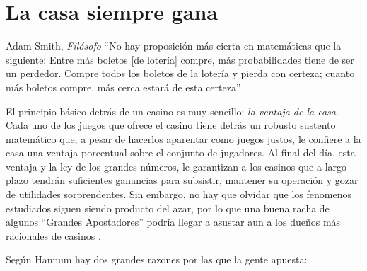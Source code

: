  \section{La casa siempre gana}



\begin{chapquote}{Adam Smith, \textit{Filósofo} \cite{smith1963wealth}}
	``No hay proposición más cierta en matemáticas que la siguiente: Entre más boletos [de lotería] compre, más probabilidades tiene de ser un perdedor. Compre todos los boletos de la lotería y pierda con certeza; cuanto más boletos compre, más cerca estará de esta certeza''
\end{chapquote}



El principio básico detrás de un casino es muy sencillo: \emph{la ventaja de la casa}. Cada uno de los juegos que ofrece el casino tiene detrás un robusto sustento matemático que, a pesar de hacerlos aparentar como juegos justos, le confiere a la casa una ventaja porcentual sobre el conjunto de jugadores. Al final del día, esta ventaja y la ley de los grandes números, le garantizan a los casinos que a largo plazo tendrán suficientes ganancias para subsistir, mantener su operación y gozar de utilidades sorprendentes. Sin embargo, no hay que olvidar que los fenomenos estudiados siguen siendo producto del azar, por lo que una buena racha de algunos ``Grandes Apostadores'' podría llegar a asustar aun a los dueños  más racionales de casinos \cite{hannum2005practical}.



Según Hannum \cite{hannum2005practical} hay dos grandes razones por las que la gente apuesta:

